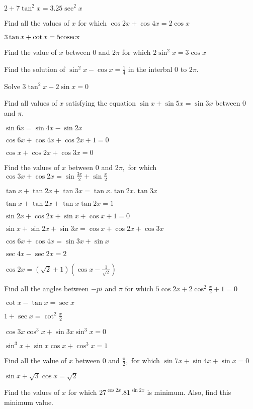 \item $2 + 7\tan^2x = 3.25\sec^2x$
\item Find all the values of $x$ for which $\cos 2x + \cos 4x = 2\cos x$
\item $3\tan x + \cot x = 5\rm cosec x$
\item Find the value of $x$ between $0$ and $2\pi$ for which $2\sin^2x = 3\cos x$
\item Find the solution of $\sin^2x - \cos x = \frac{1}{4}$ in the interbal $0$ to $2\pi.$
\item Solve $3\tan^2x - 2\sin x = 0$
\item Find all values of $x$ satisfying the equation $\sin x + \sin5x = \sin 3x$ between $0$ and $\pi.$
\item $\sin6x = \sin4x - \sin2x$
\item $\cos6x + \cos 4x + \cos 2x + 1 = 0$
\item $\cos x + \cos 2x + \cos 3x = 0$
\item Find the values of $x$ between $0$ and $2\pi,$ for which $\cos3x + \cos2x = \sin\frac{3x}{2} +
    \sin\frac{x}{2}$
\item $\tan x+ \tan2x + \tan3x = \tan x.\tan2x.\tan3x$
\item $\tan x + \tan 2x + \tan x\tan 2x = 1$
\item $\sin2x + \cos2x + \sin x + \cos x + 1 = 0$
\item $\sin x + \sin 2x + \sin 3x = \cos x + \cos 2x + \cos 3x$
\item $\cos6x + \cos4x = \sin3x + \sin x$
\item $\sec4x - \sec2x = 2$
\item $\cos2x = (\sqrt{2} + 1)\left(\cos x - \frac{1}{\sqrt{2}}\right)$
\item Find all the angles between $-pi$ and $\pi$ for which $5\cos2x + 2\cos^2\frac{x}{2} + 1 = 0$
\item $\cot x - \tan x = \sec x$
\item $1 + \sec x = \cot^2\frac{x}{2}$
\item $\cos3x\cos^3x + \sin3x\sin^3x = 0$
\item $\sin^3x + \sin x\cos x + \cos^3x = 1$
\item Find all the value of $x$ between $0$ and $\frac{\pi}{2},$ for which $\sin 7x + \sin4x + \sin x = 0$
\item $\sin x + \sqrt{3}\cos x = \sqrt{2}$
\item Find the values of $x$ for which $27^{\cos2x}.81^{\sin2x}$ is minimum. Also, find this minimum value.
